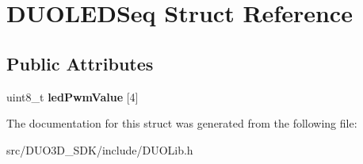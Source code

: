 \hypertarget{struct_d_u_o_l_e_d_seq}{}\section{D\+U\+O\+L\+E\+D\+Seq Struct Reference}
\label{struct_d_u_o_l_e_d_seq}
\subsection*{Public Attributes}
\begin{DoxyCompactItemize}
\item 
uint8\+\_\+t {\bfseries led\+Pwm\+Value} \mbox{[}4\mbox{]}\hypertarget{struct_d_u_o_l_e_d_seq_a1a6030cd04d04beb40b53de539b642c1}{}\label{struct_d_u_o_l_e_d_seq_a1a6030cd04d04beb40b53de539b642c1}

\end{DoxyCompactItemize}


The documentation for this struct was generated from the following file\+:\begin{DoxyCompactItemize}
\item 
src/\+D\+U\+O3\+D\+\_\+\+S\+D\+K/include/D\+U\+O\+Lib.\+h\end{DoxyCompactItemize}
